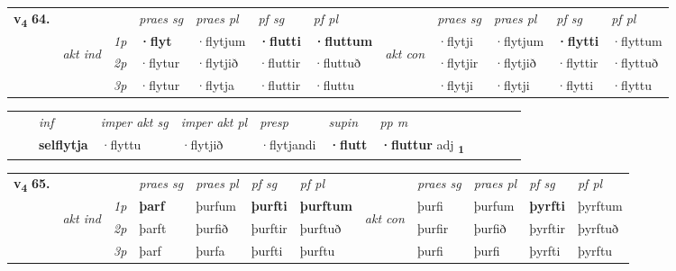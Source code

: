 \begin{tabular}{llllllllllll} \toprule
\multirow{4}{*}{{{\textbf{v{\textsubscript{4}}} \Large{\textbf{64.}}}}}  & &   &  \textit{praes sg}  & \textit{praes pl}  &\textit{ pf sg} & \textit{pf pl} &  &  \textit{praes sg}  & \textit{praes pl}  & \textit{pf sg} & \textit{pf pl } \\*
	\cmidrule{4-7} \cmidrule{9-12}
 & \multirow{3}{*}{\begin{turn}{90}\textit{akt ind}\end{turn}} & {\textit{1p}} & \textbf{·flyt} & ·flytjum    & \textbf{·flutti} & \textbf{·fluttum} & \multirow{3}{*}{\begin{turn}{90}\textit{akt con}\end{turn}} &·flytji & ·flytjum & \textbf{·flytti} & ·flyttum\\*
& &  {\textit{2p}} &  ·flytur  & ·flytjið   & ·fluttir & ·fluttuð & & ·flytjir & ·flytjið & ·flyttir & ·flyttuð \\*
& &  {\textit{3p}} & ·flytur & ·flytja   & ·fluttir & ·fluttu & & ·flytji & ·flytji& ·flytti & ·flyttu  \\*
\cmidrule{4-7} \cmidrule{9-12}
\end{tabular}


\begin{tabular}{llllllllllll}
 & & \textit{inf} & \textit{imper akt sg} & \textit{imper akt pl}   & \textit{presp} & \textit{supin}  & \textit{pp m}     \\*
  & & \textbf{selflytja} & ·flyttu  & ·flytjið   & ·flytjandi &  \textbf{·flutt}  & \textbf{·fluttur} adj \textbf{\textsubscript{1}} \\*
\cmidrule{1-12}
\end{tabular}



\begin{tabular}{llllllllllll} \toprule
\multirow{4}{*}{{{\textbf{v{\textsubscript{4}}} \Large{\textbf{65.}}}}}  & &   &  \textit{praes sg}  & \textit{praes pl}  &\textit{ pf sg} & \textit{pf pl} &  &  \textit{praes sg}  & \textit{praes pl}  & \textit{pf sg} & \textit{pf pl } \\*
	\cmidrule{4-7} \cmidrule{9-12}
 & \multirow{3}{*}{\begin{turn}{90}\textit{akt ind}\end{turn}} & {\textit{1p}} & \textbf{þarf} & þurfum    & \textbf{þurfti} & \textbf{þurftum} & \multirow{3}{*}{\begin{turn}{90}\textit{akt con}\end{turn}} &þurfi & þurfum & \textbf{þyrfti} & þyrftum\\*
& &  {\textit{2p}} &  þarft  & þurfið   & þurftir & þurftuð & & þurfir & þurfið & þyrftir & þyrftuð \\*
& &  {\textit{3p}} & þarf & þurfa   & þurfti & þurftu & & þurfi & þurfi& þyrfti & þyrftu  \\*
\cmidrule{4-7} \cmidrule{9-12}
\end{tabular}



